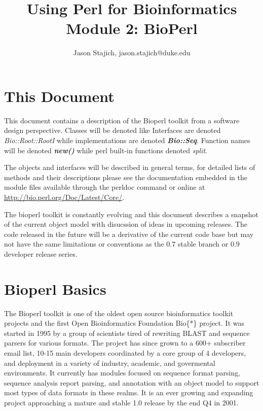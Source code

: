 \documentclass{article}
\begin{document}
\begin{titlepage}

\title{Using Perl for Bioinformatics\\ Module 2: BioPerl}
\author{Jason Stajich, jason.stajich@duke.edu}

\end{titlepage}
\maketitle

\newpage

\tableofcontents
\newpage
\setcounter{page}{0}

\section{This Document}
This document contains a description of the Bioperl toolkit from a
software design perspective.  Classes will be denoted like 
Interfaces are denoted \emph{Bio::Root::RootI} while implementations
are denoted \emph{\bf Bio::Seq}. Function names will be denoted {\bf \it
new()} while perl built-in functions denoted {\it split}.  

The objects and interfaces will be described in general
terms, for detailed lists of methods and their descriptions please see
the documentation embedded in the module files available through the
perldoc command or online at \url{http://bio.perl.org/Doc/Latest/Core/}.
\par
The bioperl toolkit is constantly evolving and this document describes a
snapshot of the current object model with disucssion of ideas in upcoming
releases.  The code released in the future will be a derivative of
the current code base but may not have the same limitations or
conventions as the 0.7 stable branch or 0.9 developer release
series.

\section{Bioperl Basics}

The Bioperl toolkit is one of the oldest open source bioinformatics
toolkit projects and the first Open Bioinformatics Foundation Bio\{*\}
project.  It was started in 1995 by a group of scientists tired of
rewriting BLAST and sequence parsers for various formats.  The
project has since grown to a 600+ subscriber email list, 10-15 main
developers coordinated by a core group of 4 developers, and deployment
in a variety of industry, academic, and govermental environments.  It
currently has modules focused on sequence format parsing, sequence
analysis report parsing, and annotation with an object model to
support most types of data formats in these realms.  It is an ever
growing and expanding project approaching a mature and stable 1.0
release by the end Q4 in 2001.
\end{document}
